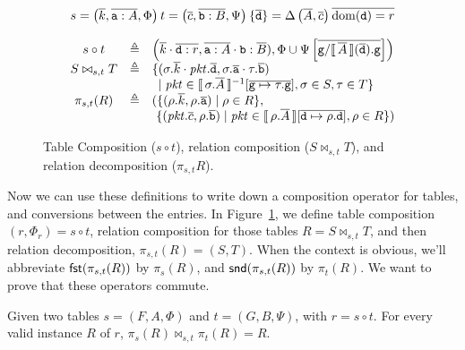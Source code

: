 \begin{figure}[tpb]
  \[\begin{array}{ccl}
      \multicolumn 3 c
      {s = \left(\vec{k},\vec{\var a : A}, \Phi\right)\hfill t = \left(\vec{c},\vec{\var b : B}, \Psi\right) \hfill \left\{\overline{\var d}\right\} = \Delta\left(\vec A, \vec{c}\right) \hfill \overline{\dom(\var d) = r}}\\\\
      s \circ t
      & \triangleq
      & \left(\vec{k}\cdot\vec{\var d : r}, \vec{\var a : A}\cdot{\var b : \vec B}),
      \Phi \cup \Psi\left[\overline{\var g /\bracbb{\vec A}(\vec{\var d}).\var g}\right]\right)
      \\[.2em]
      S \bowtie_{s,t}T
      & \triangleq
      & \{(\sigma.\vec{k}\cdot\pkt.\vec{\var d},\sigma.\vec{\var a} \cdot\tau.\vec{\var b}) \\
      && \hspace{.5em}
         \mid \pkt \in \bracbb{\sigma.\vec A}^{-1}[\overline{\var g \mapsto \tau.\var g}],
         \sigma \in S, \tau \in T \} \\
      \pi_{s,t}(R)
      & \triangleq
      & (\{(\rho.\vec k,\rho.\vec{\var a}) \mid \rho \in R\}, \\
      && ~\{(\pkt.\vec{c}, \rho.\vec{\var b}) \mid \pkt \in \bracbb{\rho.\vec A}[\overline{\var d\mapsto \rho.\var d}], \rho \in R\})
    \end{array}
  \]  
  \caption{Table Composition ($s \circ t$), relation composition
    ($S \bowtie_{s,t}T$), and relation decomposition ($\pi_{s,t}R$).}
  \label{fig:compose-tables}
\end{figure}

Now we can use these definitions to write down a composition operator
for tables, and conversions between the entries. In
Figure~\ref{fig:compose-tables}, we define table composition
$(r,\Phi_r) = s \circ t$, relation composition for those tables
$R = S \bowtie_{s,t} T$, and then relation decomposition,
$\pi_{s,t}(R) = (S,T)$. When the context is obvious, we'll abbreviate
$\mathsf{fst}(\pi_{s,t}(R))$ by $\pi_{s}(R)$, and $\mathsf{snd}(\pi_{s,t}(R))$ by
$\pi_t(R)$. We want to prove that these operators commute.

\begin{proposition}
  \label{prop:join-proj}
  Given two tables $s = (F,A,\Phi)$ and $t = (G,B, \Psi)$, with
  $r = s \circ t$. For every valid instance $R$ of $r$,
  $\pi_s(R) \bowtie_{s,t} \pi_t(R) = R$.
\end{proposition}

